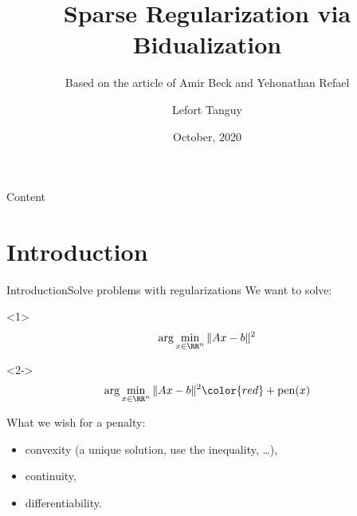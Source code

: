 \documentclass[10pt,aspectratio=43]{beamer}
\title[Regularization via Bidualization] %
	{Sparse Regularization via Bidualization} %
\subtitle{Based on the article of Amir Beck and Yehonathan Refael}
\date{October, 2020} %
\author[]%
	{%
		{Lefort Tanguy}%
	}
\institute[
	]
	{%
	    University of Montpellier
	}
\begin{document}
	\maketitle

	\begin{frame}{Content}{}
		\tableofcontents
	\end{frame}


\section{Introduction}
\begin{frame}{Introduction}{Solve problems with regularizations}
We want to solve:
\begin{onlyenv}<1>
\[\arg\min_{x\in\RR^n} \|Ax-b\|^2  \]
\end{onlyenv}

\begin{onlyenv}<2->
\[\arg\min_{x\in\RR^n} \|Ax-b\|^2 \color{red}+ \mathrm{pen}(x)\]

What we wish for a penalty:
\begin{itemize}
    \item convexity (a unique solution, use the inequality, \dots),
    \item continuity,
    \item differentiability.
\end{itemize}
\end{onlyenv}
\end{frame}

\end{document}
